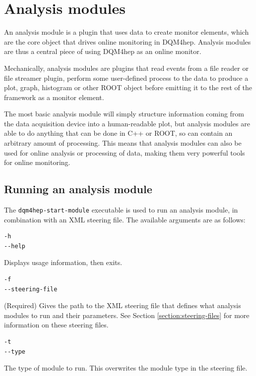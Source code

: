 \section{Analysis modules}
An analysis module is a plugin that uses data to create monitor elements, which are the core object that drives online monitoring in \acrshort{DQM4hep}. Analysis modules are thus a central piece of using \acrshort{DQM4hep} as an online monitor.

Mechanically, analysis modules are plugins that read events from a file reader or file streamer plugin, perform some user-defined process to the data to produce a plot, graph, histogram or other ROOT object before emitting it to the rest of the framework as a monitor element.

The most basic analysis module will simply structure information coming from the data acquisition device into a human-readable plot, but analysis modules are able to do anything that can be done in C++ or ROOT, so can contain an arbitrary amount of processing. This means that analysis modules can also be used for online analysis or processing of data, making them very powerful tools for online monitoring. 

\subsection{Running an analysis module}
The \texttt{dqm4hep-start-module} executable is used to run an analysis module, in combination with an XML steering file. The available arguments are as follows:

\begin{lstlisting}
-h
--help
\end{lstlisting}

Displays usage information, then exits.

\begin{lstlisting}
-f
--steering-file
\end{lstlisting}

(Required) Gives the path to the XML steering file that defines what analysis modules to run and their parameters. See Section \ref{section:steering-files} for more information on these steering files. 

\begin{lstlisting}
-t
--type
\end{lstlisting}

The type of module to run. This overwrites the module type in the steering file.

